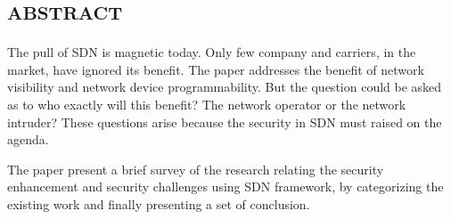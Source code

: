 %
\section*{\small \textsc{abstract}}
The pull of \ac{SDN} is magnetic today. Only few company and carriers, in the market, have ignored its benefit. The paper addresses the benefit of network visibility and network device programmability. But the question could be asked as to who exactly will this benefit? The network operator or the network intruder? These questions arise because the security in \ac{SDN} must raised on the agenda.

The paper present a brief survey of the research relating the security enhancement and security challenges using \ac{SDN} framework, by categorizing the existing work and finally presenting a set of conclusion.

